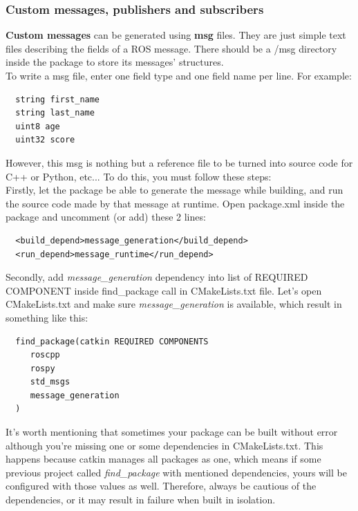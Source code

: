 \documentclass[pdftex,12pt,a4paper]{article}
\begin{document}
  \subsubsection{Custom messages, publishers and subscribers}
  \label{subsubsec:publishers_and_subscribers}
  \textbf{Custom messages} can be generated using \textbf{msg} files. They are just simple text files describing the fields of a ROS message. There should be a /msg directory inside the package to store its messages' structures.\\
  To write a msg file, enter one field type and one field name per line. For example:
  \begin{lstlisting}
  string first_name
  string last_name
  uint8 age
  uint32 score
  \end{lstlisting}
  However, this msg is nothing but a reference file to be turned into source code for C++ or Python, etc... To do this, you must follow these steps:\\
  Firstly, let the package be able to generate the message while building, and run the source code made by that message at runtime. Open package.xml inside the package and uncomment (or add) these 2 lines:
  \begin{lstlisting}
  <build_depend>message_generation</build_depend>
  <run_depend>message_runtime</run_depend>
  \end{lstlisting}
  Secondly, add \textit{message\_generation} dependency into list of REQUIRED COMPONENT inside find\_package call in CMakeLists.txt file. Let's open \\CMakeLists.txt and make sure \textit{message\_generation} is available, which result in something like this:
  \begin{lstlisting}
  find_package(catkin REQUIRED COMPONENTS
     roscpp
     rospy
     std_msgs
     message_generation
  )
  \end{lstlisting}
  It's worth mentioning that sometimes your package can be built without error although you're missing one or some dependencies in CMakeLists.txt. This happens because catkin manages all packages as one, which means if some previous project called \textit{find\_package} with mentioned dependencies, yours will be configured with those values as well. Therefore, always be cautious of the dependencies, or it may result in failure when built in isolation.
  
\end{document}
